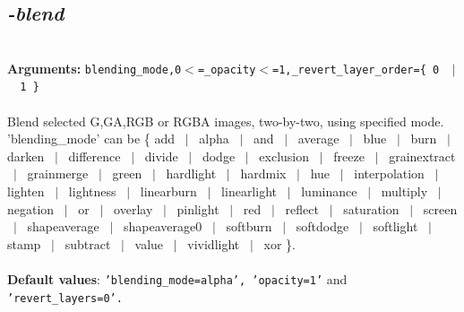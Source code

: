 \documentclass[a4paper,11pt,twoside]{book}
\begin{document}
\subsection{\emph{-blend} }\vspace*{-0.5em}
~\\\textbf{Arguments: } 
{\small \texttt{blending\_mode,0$<$=\_opacity$<$=1,\_revert\_layer\_order=\{ 0 ~$|$~ 1 \}}}\\~\\
Blend selected G,GA,RGB or RGBA images, two-by-two, using specified mode.
~\\'blending\_mode' can be \{ add ~$|$~ alpha ~$|$~ and ~$|$~ average ~$|$~ blue ~$|$~ burn ~$|$~ darken ~$|$~ difference ~$|$~
divide ~$|$~ dodge ~$|$~ exclusion ~$|$~ freeze ~$|$~ grainextract ~$|$~ grainmerge ~$|$~ green ~$|$~ hardlight ~$|$~
hardmix ~$|$~ hue ~$|$~ interpolation ~$|$~ lighten ~$|$~ lightness ~$|$~ linearburn ~$|$~ linearlight ~$|$~ luminance ~$|$~
multiply ~$|$~ negation ~$|$~ or ~$|$~ overlay ~$|$~ pinlight ~$|$~ red ~$|$~ reflect ~$|$~ saturation ~$|$~
screen ~$|$~ shapeaverage ~$|$~ shapeaverage0 ~$|$~ softburn ~$|$~ softdodge ~$|$~ softlight ~$|$~ stamp ~$|$~ subtract ~$|$~ value ~$|$~
vividlight ~$|$~ xor \}.
~\\~\\\textbf{Default values}: {\small \texttt{'blending\_mode=alpha', 'opacity=1'} and \texttt{'revert\_layers=0'.}}
\end{document}
